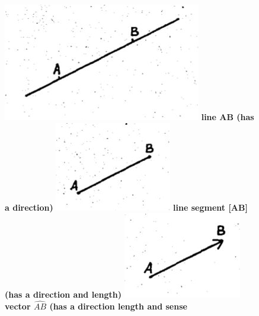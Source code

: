 \documentclass[11pt]{amsbook}
\begin{document}
\begin{figure}[!htb]
  \includegraphics[width=\linewidth]{images/12.jpeg}
  \textbf{line AB (has a direction)}
\endminipage\hfill
{}
  \includegraphics[width=\linewidth]{images/13.jpeg}
  \textbf{line segment [AB] (has a direction and length)}
\endminipage\hfill
{}%
  \includegraphics[width=\linewidth]{images/14.jpeg}
  \textbf{vector $\widehat{AB}$ (has a direction length and sense}
\endminipage
\end{figure}
\end{document}
